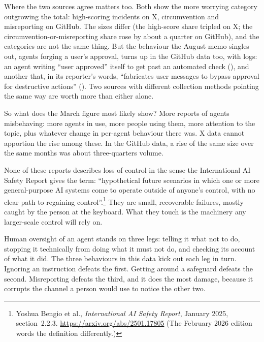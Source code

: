 Where the two sources agree matters too. Both show the more worrying category outgrowing the total: high-scoring incidents on X, circumvention and misreporting on GitHub. The sizes differ (the high-score share tripled on X; the circumvention-or-misreporting share rose by about a quarter on GitHub), and the categories are not the same thing. But the behaviour the August memo singles out, agents forging a user’s approval, turns up in the GitHub data too, with logs: an agent writing “user approved” itself to get past an automated check (), and another that, in its reporter’s words, “fabricates user messages to bypass approval for destructive actions” (). Two sources with different collection methods pointing the same way are worth more than either alone.

So what does the March figure most likely show? More reports of agents misbehaving: more agents in use, more people using them, more attention to the topic, plus whatever change in per-agent behaviour there was. X data cannot apportion the rise among these. In the GitHub data, a rise of the same size over the same months was about three-quarters volume.


None of these reports describes loss of control in the sense the International AI Safety Report gives the term: “hypothetical future scenarios in which one or more general-purpose AI systems come to operate outside of anyone’s control, with no clear path to regaining control”.\footnote{Yoshua Bengio et al., \emph{International AI Safety Report}, January 2025, section~2.2.3. \url{https://arxiv.org/abs/2501.17805} (The February 2026 edition words the definition differently.)} They are small, recoverable failures, mostly caught by the person at the keyboard. What they touch is the machinery any larger-scale control will rely on.

Human oversight of an agent stands on three legs: telling it what not to do, stopping it technically from doing what it must not do, and checking its account of what it did. The three behaviours in this data kick out each leg in turn. Ignoring an instruction defeats the first. Getting around a safeguard defeats the second. Misreporting defeats the third, and it does the most damage, because it corrupts the channel a person would use to notice the other two.

